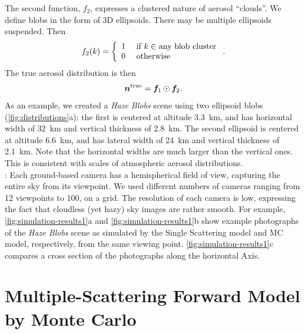\documentclass[10pt,letterpaper]{article}
\begin{document}
The second function, $f_2$, expresses a clustered nature of aerosol
``clouds''. We define blobs in the form of 3D ellipsoids. There may be
multiple ellipsoids suspended.  Then
\begin{equation}
  f_2(k) =
  \left\{
    \begin{array}{ll}
      1  & \mbox{ if $k\in$ any blob cluster} \\
      0  & \mbox{ otherwise}
      \label{eq:f2}
    \end{array}
  \right.
  .
  \hspace{-0.05cm}
\end{equation}
The true aerosol distribution is then
\begin{equation}
  \label{eq:ntrue}
  {\bm n}^{\rm true}={\bm f}_1\odot {\bm f}_2  .
  \hspace{-0.05cm}
\end{equation}
As an example, we created a {\em Haze Blobs} scene using two ellipsoid
blobs (\cref{fig:distributions}a): the first is centered at altitude
\SI{3.3}{\km}, and has horizontal width of \SI{32}{\km} and vertical
thickness of \SI{2.8}{\km}. The second ellipsoid is centered at
altitude \SI{6.6}{\km}, and has lateral width of \SI{24}{\km} and
vertical thickness of \SI{2.1}{\km}. Note that the horizontal widths
are much larger than the vertical ones. This is consistent with scales
of atmospheric aerosol distributions.
\\

: Each ground-based camera has a hemispherical
field of view, capturing the entire sky from its viewpoint. We used
different numbers of cameras ranging from 12 viewpoints to 100, on a
grid.  The resolution of each camera is low, expressing the fact that
cloudless (yet hazy) sky images are rather smooth.  For example,
\cref{fig:simulation-results1}a and \cref{fig:simulation-results1}b
show example photographs of the {\em Haze Blobs} scene as simulated by
the Single Scattering model and MC model, respectively, from the same
viewing point.  \cref{fig:simulation-results1}c compares a cross
section of the photographs along the horizontal Axis.


\section{Multiple-Scattering Forward Model by Monte Carlo}
\label{sec:monte-carlo-simul}
\end{document}
